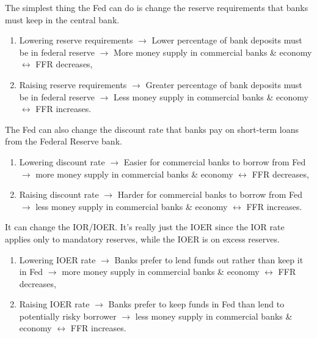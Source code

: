 \documentclass{article}
\begin{document}
    \begin{definition}
      The simplest thing the Fed can do is change the reserve requirements that banks must keep in the central bank.
      \begin{enumerate}
        \item Lowering reserve requirements $\rightarrow$ Lower percentage of bank deposits must be in federal reserve $\rightarrow$  More money supply in commercial banks \& economy $\leftrightarrow$ FFR decreases,
        \item Raising reserve requirements $\rightarrow$ Greater percentage of bank deposits must be in federal reserve $\rightarrow$  Less money supply in commercial banks \& economy $\leftrightarrow$ FFR increases.
      \end{enumerate}
    \end{definition}

    \begin{definition}
      The Fed can also change the discount rate that banks pay on short-term loans from the Federal Reserve bank.
      \begin{enumerate}
        \item Lowering discount rate $\rightarrow$ Easier for commercial banks to borrow from Fed $\rightarrow$ more money supply in commercial banks \& economy $\leftrightarrow$ FFR decreases,
        \item Raising discount rate $\rightarrow$ Harder for commercial banks to borrow from Fed $\rightarrow$ less money supply in commercial banks \& economy $\leftrightarrow$ FFR increases.
      \end{enumerate}
    \end{definition}

    \begin{definition}
      It can change the IOR/IOER. It's really just the IOER since the IOR rate applies only to mandatory reserves, while the IOER is on excess reserves.
      \begin{enumerate}
        \item Lowering IOER rate $\rightarrow$ Banks prefer to lend funds out rather than keep it in Fed $\rightarrow$ more money supply in commercial banks \& economy $\leftrightarrow$ FFR decreases,
        \item Raising IOER rate $\rightarrow$ Banks prefer to keep funds in Fed than lend to potentially risky borrower $\rightarrow$ less money supply in commercial banks \& economy $\leftrightarrow$ FFR increases.
      \end{enumerate}
    \end{definition}
\end{document}
